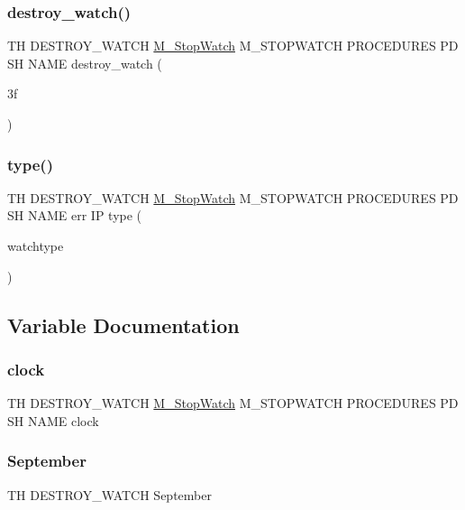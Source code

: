 \subsubsection{\texorpdfstring{destroy\+\_\+watch()}{destroy\_watch()}}
{\footnotesize\ttfamily TH D\+E\+S\+T\+R\+O\+Y\+\_\+\+W\+A\+T\+CH \hyperlink{option__stopwatch_83_8txt_aa2011fc45a5e502e87ee50996a8a9305}{M\+\_\+\+Stop\+Watch} M\+\_\+\+S\+T\+O\+P\+W\+A\+T\+CH P\+R\+O\+C\+E\+D\+U\+R\+ES PD SH N\+A\+ME destroy\+\_\+watch (\begin{DoxyParamCaption}\item[{3f}]{ }\end{DoxyParamCaption})}

\mbox{\label{destroy__watch_83_8txt_a7bc32e4b0bf5a4206ac0c208a77e9d4b}} 
\subsubsection{\texorpdfstring{type()}{type()}}
{\footnotesize\ttfamily TH D\+E\+S\+T\+R\+O\+Y\+\_\+\+W\+A\+T\+CH \hyperlink{option__stopwatch_83_8txt_aa2011fc45a5e502e87ee50996a8a9305}{M\+\_\+\+Stop\+Watch} M\+\_\+\+S\+T\+O\+P\+W\+A\+T\+CH P\+R\+O\+C\+E\+D\+U\+R\+ES PD SH N\+A\+ME err IP type (\begin{DoxyParamCaption}\item[{watchtype}]{ }\end{DoxyParamCaption})}



\subsection{Variable Documentation}
\mbox{\label{destroy__watch_83_8txt_ac1453e74487611128ccb9ee120e5c70d}} 
\subsubsection{\texorpdfstring{clock}{clock}}
{\footnotesize\ttfamily TH D\+E\+S\+T\+R\+O\+Y\+\_\+\+W\+A\+T\+CH \hyperlink{option__stopwatch_83_8txt_aa2011fc45a5e502e87ee50996a8a9305}{M\+\_\+\+Stop\+Watch} M\+\_\+\+S\+T\+O\+P\+W\+A\+T\+CH P\+R\+O\+C\+E\+D\+U\+R\+ES PD SH N\+A\+ME clock}

\mbox{\label{destroy__watch_83_8txt_acabdf4ce798cad6afe1d3f1796bf4814}} 
\subsubsection{\texorpdfstring{September}{September}}
{\footnotesize\ttfamily TH D\+E\+S\+T\+R\+O\+Y\+\_\+\+W\+A\+T\+CH September}

